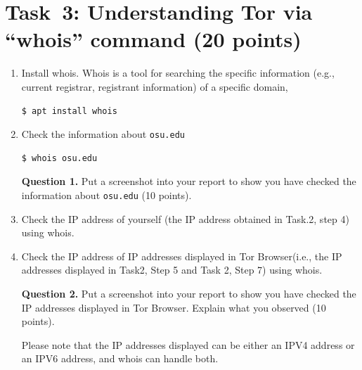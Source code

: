 \documentclass[11pt]{article}
\newcommand{\tor}{{\sf Tor}\xspace}
\newcommand{\torbw}{{\sf Tor Browser}\xspace}
\begin{document}
\section{Task~3: Understanding \tor via ``whois'' command (20 points)} 
\begin{enumerate}
\item Install \textsf{whois}. Whois is a tool for searching the specific information (e.g., current registrar, registrant information) of a specific domain, 
 \begin{lstlisting}
$ apt install whois
\end{lstlisting}\vspace{-6mm}
\item Check the information about \texttt{osu.edu}
 \begin{lstlisting}
$ whois osu.edu
\end{lstlisting}\vspace{-6mm}

\textbf{Question 1.} Put a screenshot into your report to show you have checked the information about \texttt{osu.edu} (10 points). 

\item Check the IP address of yourself (the IP address obtained in Task.2, step 4) using \textsf{whois}.

\item Check the IP address of IP addresses displayed in \torbw (i.e., the IP addresses displayed in Task2, Step 5 and Task 2, Step 7) using \textsf{whois}.

\textbf{Question 2.} Put a screenshot into your report to show you have checked the IP addresses displayed in \torbw. Explain what you observed (10 points). 

Please note that the IP addresses displayed can be either an IPV4 address or an IPV6 address, and \textsf{whois} can handle both.  

\end{enumerate}
\end{document}
